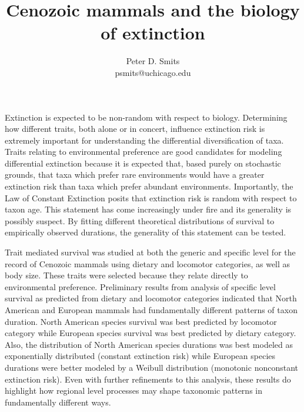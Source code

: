\documentclass{article}
\title{Cenozoic mammals and the biology of extinction}
\author{Peter D. Smits\\ psmits@uchicago.edu}
\begin{document}
\maketitle

Extinction is expected to be non-random with respect to biology. Determining how different traits, both alone or in concert, influence extinction risk is extremely important for understanding the differential diversification of taxa. Traits relating to environmental preference are good candidates for modeling differential extinction because it is expected that, based purely on stochastic grounds, that taxa which prefer rare environments would have a greater extinction risk than taxa which prefer abundant environments. Importantly, the Law of Constant Extinction posits that extinction risk is random with respect to taxon age. This statement has come increasingly under fire and its generality is possibly suspect. By fitting different theoretical distributions of survival to empirically observed durations, the generality of this statement can be tested. 

Trait mediated survival was studied at both the generic and specific level for the record of Cenozoic mammals using dietary and locomotor categories, as well as body size. These traits were selected because they relate directly to environmental preference. Preliminary results from analysis of specific level survival as predicted from dietary and locomotor categories indicated that North American and European mammals had fundamentally different patterns of taxon duration. North American species survival was best predicted by locomotor category while European species survival was best predicted by dietary category. Also, the distribution of North American species durations was best modeled as exponentially distributed (constant extinction risk) while European species durations were better modeled by a Weibull distribution (monotonic nonconstant extinction risk). Even with further refinements to this analysis, these results do highlight how regional level processes may shape taxonomic patterns in fundamentally different ways.  
\end{document}
